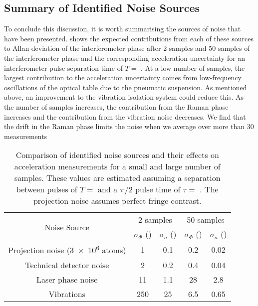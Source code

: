 \subsection{Summary of Identified Noise Sources}\label{subsec:noise_sources}
To conclude this discussion, it is worth summarising the
sources of noise that have been presented. 
 shows the expected contributions from
each of these sources to Allan deviation of the interferometer phase after 2 samples and 50
samples of the
interferometer phase and the corresponding acceleration uncertainty
for an interferometer pulse separation time of $T =$
. At a low number of samples, the largest
contribution to the acceleration uncertainty comes from low-frequency
oscillations of the optical table due to the pneumatic suspension. As mentioned above, an improvement to the
vibration isolation system could reduce this. As the
number of samples increases, the contribution from the Raman phase
increases and the contribution from the vibration noise decreases.
We find that the drift
in the Raman phase limits the noise
when we average over more than 30 measurements
\begin{table}[htpb!]
  \centering
  \begin{tabular}{ccccc}
    \toprule
    \multirow{2}{*}{Noise Source}  & \multicolumn{2}{c}{2 samples} &
    \multicolumn{2}{c}{50 samples} \\
                                  & $\sigma_{\Phi}$  (\sivalue{}{\milli\radian})  &\(\sigma_a\)
    (\sivalue{}{\micro\meter\per\s\squared}) &
    $\sigma_{\Phi}$  (\sivalue{}{\milli\radian})&\(\sigma_a\)
    (\sivalue{}{\micro\meter\per\s\squared})\\
    \midrule
    Projection noise (\num{3e6} atoms) & 1 & 0.1 & 0.2& 0.02 \\
    Technical detector noise & 2 & 0.2 & 0.4 & 0.04\\
    Laser phase noise  & 11 & 1.1 & 28 & 2.8\\
    Vibrations & 250 & 25 & 6.5 & 0.65\\
    \bottomrule
  \end{tabular}
  \caption[Comparison of known noise sources.]{Comparison of
    identified noise sources and their effects on
  acceleration measurements for a small and large number of samples. These values are estimated assuming a
separation between pulses of \(T = \)  and a \(\pi/2\)
pulse time of \(\tau = \) . The projection noise
assumes perfect fringe contrast.}
  \label{tab:noise_sources}
\end{table}
